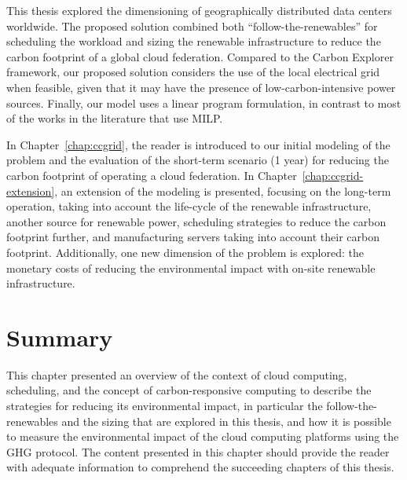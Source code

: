 This thesis explored the dimensioning of geographically distributed data centers worldwide. The proposed solution combined both ``follow-the-renewables'' for scheduling the workload and sizing the renewable infrastructure to reduce the carbon footprint of a global cloud federation. Compared to the Carbon Explorer framework, our proposed solution considers the use of the local electrical grid when feasible, given that it may have the presence of low-carbon-intensive power sources. Finally, our model uses a linear program formulation, in contrast to most of the works in the literature that use MILP.

In Chapter~\ref{chap:ccgrid}, the reader is introduced to our initial modeling of the problem and the evaluation of the short-term scenario (1 year) for reducing the carbon footprint of operating a cloud federation. In Chapter~\ref{chap:ccgrid-extension}, an extension of the modeling is presented, focusing on the long-term operation, taking into account the life-cycle of the renewable infrastructure, another source for renewable power, scheduling strategies to reduce the carbon footprint further, and manufacturing servers taking into account their carbon footprint. Additionally,  one new dimension of the problem is explored: the monetary costs of reducing the environmental impact with on-site renewable infrastructure.




\section{Summary}

This chapter presented an overview of the context of cloud computing, scheduling, and the concept of carbon-responsive computing to describe the strategies for reducing its environmental impact, in particular the follow-the-renewables and the sizing that are explored in this thesis, and how it is possible to measure the environmental impact of the cloud computing platforms using the GHG protocol. The content presented in this chapter should provide the reader with adequate information to comprehend the succeeding chapters of this thesis.
